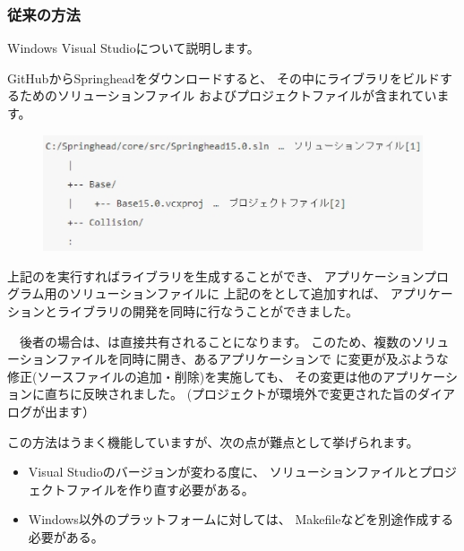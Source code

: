 \subsubsection{従来の方法}
\label{subsubsec:OldMethod}
\parindent=0pt

Windows Visual Studioについて説明します。

\medskip
GitHubからSpringheadをダウンロードすると、
その中にライブラリをビルドするためのソリューションファイル
およびプロジェクトファイルが含まれています。

\begin{narrow}[15pt]
	\begin{figure}[h]
	    \begin{center}
	    \includegraphics[width=.9\textwidth]{fig/DownloadTree.eps}
	    \end{center}
	    \label{fig:DownloadTree}
	\end{figure}
\end{narrow}

上記の\SolutionFile を実行すればライブラリを生成することができ、
アプリケーションプログラム用のソリューションファイルに
上記の\ProjectFile をとして追加すれば、
アプリケーションとライブラリの開発を同時に行なうことができました。

　後者の場合は、\ProjectFile は直接共有されることになります。
このため、複数のソリューションファイルを同時に開き、あるアプリケーションで
\ProjectFile に変更が及ぶような修正(ソースファイルの追加・削除)を実施しても、
その変更は他のアプリケーションに直ちに反映されました。
(プロジェクトが環境外で変更された旨のダイアログが出ます）

\medskip
この方法はうまく機能していますが、次の点が難点として挙げられます。

\begin{itemize}
  \item	Visual Studioのバージョンが変わる度に、
	ソリューションファイルとプロジェクトファイルを作り直す必要がある。
  \item	Windows以外のプラットフォームに対しては、
	Makefileなどを別途作成する必要がある。
\end{itemize}

